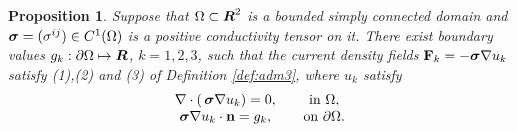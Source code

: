 \documentclass[11pt]{amsart}
\theoremstyle{plain}
\newtheorem{Prop}[Thm]{Proposition}
\theoremstyle{remark}
\numberwithin{equation}{section}
\numberwithin{Thm}{section}
\def\R{\mbox{\boldmath$R$}}
\def\F{{\bf F}}
\def\n{{\bf n}}
\def\ds{\displaystyle}
\def\Sigma{\mbox{\boldmath$\sigma$}}
\begin{document}
\begin{Prop} \label{thm:anisoadm}
Suppose that $\Omega\subset\R^2$ is a bounded simply connected domain and $\Sigma=(\sigma^{ij})\in C^1(\Omega)$ is a positive conductivity tensor on it. There exist boundary values $g_k:\partial\Omega\mapsto\R$, $k=1,2,3$, such that the current density fields $\F_k = -\Sigma \nabla u_k $ satisfy (1),(2) and (3) of Definition \ref{def:adm3}, where $u_k$ satisfy
\begin{equation}\label{Eqn3.2}
\begin{array}{cc}\ds
\nabla\cdot(\,\Sigma\nabla u_k)  =0, &\quad \text{in $\Omega$},\\
\Sigma\nabla u_k\cdot \n=g_k, &\quad \text{on $\partial\Omega$}.
\end{array}
\end{equation}
\end{Prop}
\end{document}
